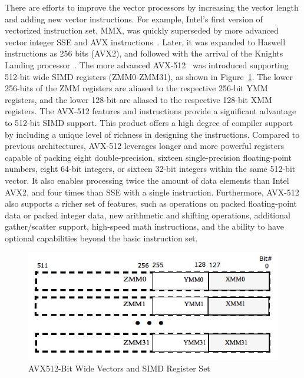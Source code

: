 \documentclass[5p,times,twocolumn]{elsarticle}
\begin{document}
There are efforts to improve the vector processors by increasing the vector
length and adding new vector instructions. For example, Intel's first version of vectorized instruction set, MMX, was quickly superseded by more advanced vector integer SSE and AVX instructions~\cite{intelsse, intelavx, avxsets}. Later, it was expanded to Haswell instructions as 256 bits (AVX2),
and followed with the arrival of the Knights Landing processor~\cite{avx-info}. The more advanced
AVX-512~\cite{Intelref} was introduced supporting 512-bit wide SIMD registers (ZMM0-ZMM31), as shown in Figure~\ref{fig:avxmms}. The lower 256-bits of the ZMM registers are
aliased to the respective 256-bit YMM registers, and the lower 128-bit are
aliased to the respective 128-bit XMM registers.
%
The AVX-512 features and instructions provide a significant advantage to 512-bit SIMD support.
This product offers a high degree of compiler support by including a unique level of richness
in designing the instructions.
%
Compared to previous architectures, AVX-512 leverages longer and more
powerful registers capable of packing eight double-precision, sixteen
single-precision floating-point numbers, eight 64-bit integers, or sixteen 32-bit integers within the same 512-bit vector.
It also enables processing twice the amount of data elements than Intel AVX2, and four
times than SSE with a single instruction.
%
Furthermore, AVX-512 also supports a richer set of features, such as operations on packed
floating-point data or packed integer data, new arithmetic and shifting operations, additional
gather/scatter support, high-speed math instructions, and the ability to have
optional capabilities beyond the basic instruction set.

\begin{figure}[h]
    \centering
    \includegraphics[width=\linewidth]{avx_mms.png}
    \caption{AVX512-Bit Wide Vectors and SIMD Register Set}
    \label{fig:avxmms}
\end{figure}
\end{document}
